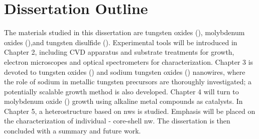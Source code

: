 \section{Dissertation Outline}
The materials studied in this dissertation are tungsten oxides (), molybdenum oxides (),and tungsten disulfide (). Experimental tools will be introduced in Chapter 2, including CVD apparatus and substrate treatments for growth, electron microscopes and optical spectrometers for characterization. Chapter 3 is devoted to tungsten oxides () and sodium tungsten oxides () nanowires, where the role of sodium in metallic tungsten precursors are thoroughly investigated; a potentially scalable growth method is also developed. Chapter 4 will turn to molybdenum oxide () growth using alkaline metal compounds as catalysts. In Chapter 5, a heterostructure based on  \glspl{nw} is studied. Emphasis will be placed on the characterization of individual - core-shell \gls{nw}. The dissertation is then concluded with a summary and future work. 
